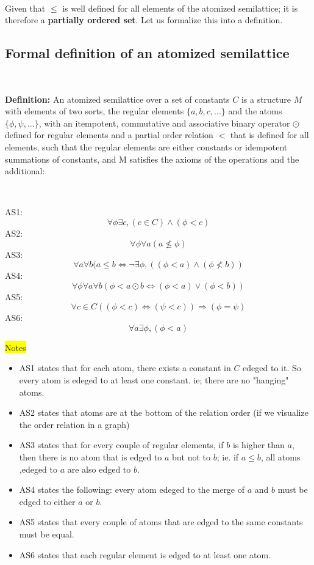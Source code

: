 \documentclass[a4paper, 11pt]{article}
\begin{document}
\

Given that $\leq$ is well defined for all elements of the atomized semilattice; it is therefore a \textbf{partially ordered set}. Let us formalize this into a definition.

\subsection{Formal definition of an atomized semilattice}

\

\begin{tcolorbox} 
	\textbf{Definition:} An atomized semilattice over a set of constants $C$ is a structure $M$ with elements of two sorts, the regular elements $\{a,b,c,...\}$ and the atoms $\{\phi, \psi, ...\}$, with an itempotent, commutative and associative binary operator $\odot$ defined for regular elements and a partial order relation $<$ that is defined for all elements, such that the regular elements are either constants or idempotent summations of constants, and M satisfies the axioms of the operations and the additional:

\

	AS1: $$\forall \phi \exists c, (c \in C) \land (\phi < c)$$
	AS2: $$\forall \phi \forall a (a \not \leq \phi)$$
	AS3: $$\forall a \forall b (a \leq b \Leftrightarrow \neg \exists \phi, ((\phi < a) \land (\phi \not < b))$$
	AS4: $$\forall \phi \forall a \forall b (\phi < a \odot b \Leftrightarrow (\phi < a) \lor (\phi < b))$$
	AS5: $$\forall c \in C ((\phi < c) \Leftrightarrow (\psi < c)) \Rightarrow (\phi = \psi)$$
	AS6: $$\forall a \exists \phi, (\phi < a)$$
\end{tcolorbox}

\colorbox{yellow}{Notes}

\begin{itemize} 
	\item AS1 states that for each atom, there exists a constant in $C$ edeged to it. So every atom is edeged to at least one constant. ie; there are no "hanging" atoms.	
	\item AS2 states that atoms are at the bottom of the relation order (if we visualize the order relation in a graph)
	\item AS3 states that for every couple of regular elements, if $b$ is higher than $a$, then there is no atom that is edged to $a$ but not to $b$; ie. if $a \leq b$, all atoms ,edeged to $a$ are also edged to $b$.
	\item AS4 states the following: every atom edeged to the merge of $a$ and $b$ must be edged to either $a$ or $b$.
	\item AS5 states that every couple of atoms that are edged to the same constants must be equal.
	\item AS6 states that each regular element is edged to at least one atom.
\end{itemize}
\end{document}
